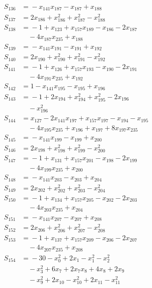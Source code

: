 \begin{align*}
S_{136} &={} -x_{141}x_{187} -x_{187} +x_{188} \\
S_{137} &={} 2x_{186} +x_{186}^{2} +x_{187}^{2} -x_{188}^{2} \\
S_{138} &={} -1 +x_{123} +x_{157}x_{189} -x_{186} -2x_{187} \\
&\quad{} -4x_{187}x_{235} +x_{188} \\
S_{139} &={} -x_{141}x_{191} -x_{191} +x_{192} \\
S_{140} &={} 2x_{190} +x_{190}^{2} +x_{191}^{2} -x_{192}^{2} \\
S_{141} &={} -1 +x_{126} +x_{157}x_{193} -x_{190} -2x_{191} \\
&\quad{} -4x_{191}x_{235} +x_{192} \\
S_{142} &={} 1 -x_{141}x_{195} -x_{195} +x_{196} \\
S_{143} &={} -1 +2x_{194} +x_{194}^{2} +x_{195}^{2} -2x_{196} \\
&\quad{} -x_{196}^{2} \\
S_{144} &={} x_{127} -2x_{141}x_{197} +x_{157}x_{197} -x_{194} -x_{195} \\
&\quad{} -4x_{195}x_{235} +x_{196} +x_{197} +8x_{197}x_{235} \\
S_{145} &={} -x_{141}x_{199} -x_{199} +x_{200} \\
S_{146} &={} 2x_{198} +x_{198}^{2} +x_{199}^{2} -x_{200}^{2} \\
S_{147} &={} -1 +x_{131} +x_{157}x_{201} -x_{198} -2x_{199} \\
&\quad{} -4x_{199}x_{235} +x_{200} \\
S_{148} &={} -x_{141}x_{203} -x_{203} +x_{204} \\
S_{149} &={} 2x_{202} +x_{202}^{2} +x_{203}^{2} -x_{204}^{2} \\
S_{150} &={} -1 +x_{134} +x_{157}x_{205} -x_{202} -2x_{203} \\
&\quad{} -4x_{203}x_{235} +x_{204} \\
S_{151} &={} -x_{141}x_{207} -x_{207} +x_{208} \\
S_{152} &={} 2x_{206} +x_{206}^{2} +x_{207}^{2} -x_{208}^{2} \\
S_{153} &={} -1 +x_{137} +x_{157}x_{209} -x_{206} -2x_{207} \\
&\quad{} -4x_{207}x_{235} +x_{208} \\
S_{154} &={} -30 -x_{0}^{2} +2x_{1} -x_{1}^{2} -x_{2}^{2} \\
&\quad{} -x_{3}^{2} +6x_{7} +2x_{7}x_{8} +4x_{8} +2x_{9} \\
&\quad{} -x_{9}^{2} +2x_{10} -x_{10}^{2} +2x_{11} -x_{11}^{2} \\

\end{align*}
